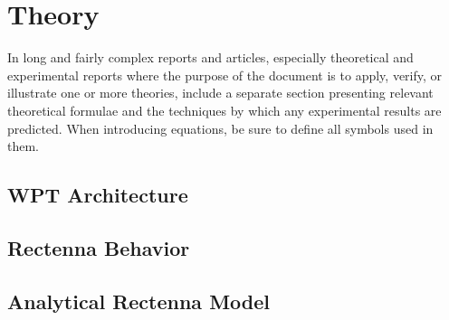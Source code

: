 \chapter{Theory}
In long and fairly complex reports and articles, especially theoretical and experimental reports where the purpose of the document is to apply, verify, or illustrate one or more theories, include a separate section presenting relevant theoretical formulae and the techniques by which any experimental results are predicted. When introducing equations, be sure to define all symbols used in them.


\section{WPT Architecture}
  
  
\section{Rectenna Behavior}
  
  
\section{Analytical Rectenna Model}
  